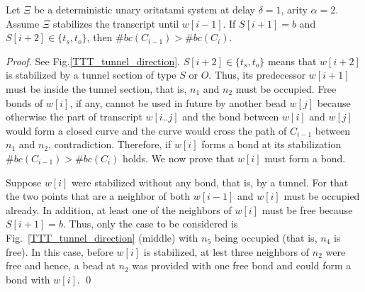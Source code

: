 \begin{lemma}
\label{TTT_entrance_Tab}
Let $\Xi$ be a deterministic unary oritatami system at delay $\delta = 1$, arity $\alpha =2$. 
Assume $\Xi$ stabilizes the transcript until $w[i-1]$. If $S[i+1] = b$ and $S[i+2] \in \{ t_s, t_o \} $, then $\#bc(C_{i-1}) > \#bc(C_{i})$.
\end{lemma}

\begin{proof}%
See Fig.\ref{TTT_tunnel_direction}.
$S[i+2] \in \{ t_s, t_o \} $ means that $w[i+2]$ is stabilized by a tunnel section of type $S$ or $O$.
Thus,  its predecessor $w[i+1]$ must be inside the tunnel section, that is, $n_1$ and $n_2$ must be occupied.
Free bonds of $w[i]$, if any, cannot be used in future by another bead $w[j]$ because otherwise the part of transcript $w[i..j]$ and the bond between $w[i]$ and $w[j]$ would form a closed curve and the curve would cross the path of $C_{i-1}$ between $n_1$ and $n_2$, contradiction.
Therefore, if $w[i]$ forms a bond at its stabilization $\#bc(C_{i-1}) > \#bc(C_{i})$ holds.
We now prove that $w[i]$ must form a bond.


Suppose $w[i]$ were stabilized without any bond, that is, by a tunnel.
For that the two points that are a neighbor of both $w[i-1]$ and $w[i]$ must be occupied already.
In addition, at least one of the neighbors of $w[i]$ must be free because $S[i+1] = b$.
Thus, only the case to be considered is Fig.~\ref{TTT_tunnel_direction} (middle) with $n_5$ being occupied (that is, $n_4$ is free).
In this case, before $w[i]$ is stabilized, at lest three neighbors of $n_2$ were free and hence, a bead at $n_2$ was provided with one free bond and could form a bond with $w[i]$. \qed




\end{proof}



